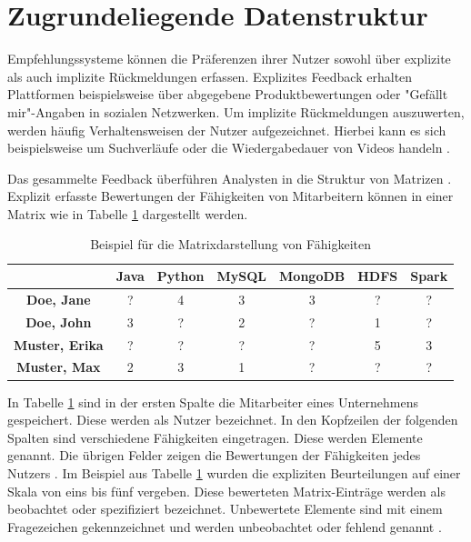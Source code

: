 \section{Zugrundeliegende Datenstruktur}
\label{ch:empfehlungssysteme:arbeitsweise}
Empfehlungssysteme können die Präferenzen ihrer Nutzer sowohl über explizite als auch implizite Rückmeldungen erfassen. Explizites Feedback erhalten Plattformen beispielsweise über abgegebene Produktbewertungen oder "Gefällt mir"-Angaben in sozialen Netzwerken. Um implizite Rückmeldungen auszuwerten, werden häufig Verhaltensweisen der Nutzer aufgezeichnet. Hierbei kann es sich beispielsweise um Suchverläufe oder die Wiedergabedauer von Videos handeln \cite[S. 3]{pu:2012}.

Das gesammelte Feedback überführen Analysten in die Struktur von Matrizen \cite[S. 11f.]{recommenderSystems:2016}. Explizit erfasste Bewertungen der Fähigkeiten von Mitarbeitern können in einer Matrix wie in Tabelle \ref{tbl:empfehlungssysteme:arbeitsweise:tbl1} dargestellt werden.

\begin{table}[h]
	\centering
	\begin{tabular}{c|c|c|c|c|c|c}
	 & \textbf{Java} & \textbf{Python} & \textbf{MySQL} & \textbf{MongoDB} & \textbf{HDFS} & \textbf{Spark}\\ 
	\hline
	\textbf{Doe, Jane}     & ? & 4 & 3 & 3 & ? & ?\\
	\textbf{Doe, John}     & 3 & ? & 2 & ? & 1 & ?\\
	\textbf{Muster, Erika} & ? & ? & ? & ? & 5 & 3\\
	\textbf{Muster, Max}   & 2 & 3 & 1 & ? & ? & ?
	\end{tabular}
	\caption{Beispiel für die Matrixdarstellung von Fähigkeiten}
	\label{tbl:empfehlungssysteme:arbeitsweise:tbl1}
\end{table}

In Tabelle \ref{tbl:empfehlungssysteme:arbeitsweise:tbl1} sind in der ersten Spalte die Mitarbeiter eines Unternehmens gespeichert. Diese werden als Nutzer bezeichnet. In den Kopfzeilen der folgenden Spalten sind verschiedene Fähigkeiten eingetragen. Diese werden Elemente genannt. Die übrigen Felder zeigen die Bewertungen der Fähigkeiten jedes Nutzers \cite[S. 1f.]{strub:2016}. Im Beispiel aus Tabelle \ref{tbl:empfehlungssysteme:arbeitsweise:tbl1} wurden die expliziten Beurteilungen auf einer Skala von eins bis fünf vergeben. Diese bewerteten Matrix-Einträge werden  als beobachtet oder spezifiziert bezeichnet. Unbewertete Elemente sind mit einem Fragezeichen gekennzeichnet und werden unbeobachtet oder fehlend genannt \cite[S. 8]{recommenderSystems:2016}.

